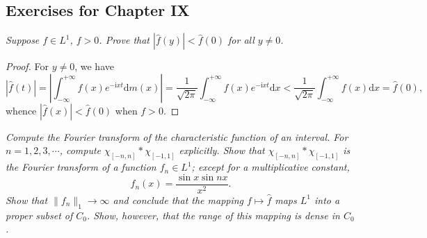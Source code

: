 \subsection{Exercises for Chapter IX}
\begin{problem}\em
Suppose $f\in L^1$, $f>0$. Prove that $|\widehat{f}(y)|<\widehat{f}(0)$ for all $y\ne 0$.
\end{problem}
\begin{proof}
For $y\ne 0$, we have 
$$
\left| \widehat{f}\left( t \right) \right|=\left| \int_{-\infty}^{+\infty}{f\left( x \right) e^{-\mathrm{i}xt}\mathrm{d}m\left( x \right)} \right|=\frac{1}{\sqrt{2\pi}}\int_{-\infty}^{+\infty}{f\left( x \right) e^{-\mathrm{i}xt}\mathrm{d}x}<\frac{1}{\sqrt{2\pi}}\int_{-\infty}^{+\infty}{f\left( x \right) \mathrm{d}x}=\widehat{f}\left( 0 \right) ,
$$
whence $|\widehat{f}(x)|<\widehat{f}(0)$ when $f>0$.
\end{proof}
\begin{problem}\em
Compute the Fourier transform of the characteristic function of an interval. For $n=1,2,3,\cdots$, compute $\chi_{[-n,n]}*\chi_{[-1,1]}$ explicitly. Show that $\chi_{[-n,n]}*\chi_{[-1,1]}$ is the Fourier transform of a function $f_n\in L^1$; except for a multiplicative constant, 
$$f_n(x)=\frac{\sin x\sin nx}{x^2}.$$
Show that $\|f_n\|_1\to\infty$ and conclude that the mapping $f\mapsto\widehat{f}$ maps $L^1$ into a proper subset of $C_0$. Show, however, that the range of this mapping is dense in $C_0$.
\end{problem}
